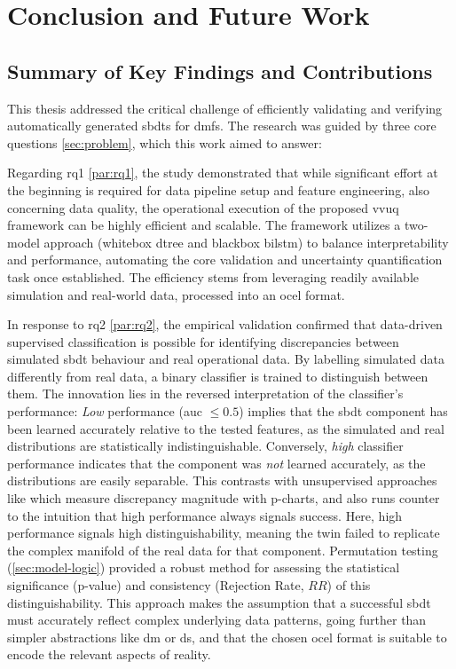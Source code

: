 \chapter{Conclusion and Future Work}
\label{chap:conclusion}

\section{Summary of Key Findings and Contributions}
\label{sec:conclusion_summary_findings}

This thesis addressed the critical challenge of efficiently validating and verifying automatically generated \gls{sbdt}s for \gls{dmfs}. The research was guided by three core questions \autoref{sec:problem}, which this work aimed to answer:

Regarding \gls{rq}1 \autoref{par:rq1}, the study demonstrated that while significant effort at the beginning is required for data pipeline setup and feature engineering, also concerning data quality, the operational execution of the proposed \gls{vvuq} framework can be highly efficient and scalable. The framework utilizes a two-model approach (whitebox \gls{dtree} and blackbox \gls{bilstm}) to balance interpretability and performance, automating the core validation and uncertainty quantification task once established. The efficiency stems from leveraging readily available simulation and real-world data, processed into an \gls{ocel} format.

In response to \gls{rq}2 \autoref{par:rq2}, the empirical validation confirmed that data-driven supervised classification is possible for identifying discrepancies between simulated \gls{sbdt} behaviour and real operational data. By labelling simulated data differently from real data, a binary classifier is trained to distinguish between them. The innovation lies in the reversed interpretation of the classifier's performance: \textit{Low} performance (\gls{auc} $\le 0.5$) implies that the \gls{sbdt} component has been learned accurately relative to the tested features, as the simulated and real distributions are statistically indistinguishable. Conversely, \textit{high} classifier performance indicates that the component was \textit{not} learned accurately, as the distributions are easily separable. This contrasts with unsupervised approaches like \textcite{dos2024digital} which measure discrepancy magnitude with p-charts, and also runs counter to the intuition that high performance always signals success. Here, high performance signals high distinguishability, meaning the twin failed to replicate the complex manifold of the real data for that component. Permutation testing (\autoref{sec:model-logic}) provided a robust method for assessing the statistical significance (p-value) and consistency (Rejection Rate, $RR$) of this distinguishability. This approach makes the assumption that a successful \gls{sbdt} must accurately reflect complex underlying data patterns, going further than simpler abstractions like \gls{dm} or \gls{ds}, and that the chosen \gls{ocel} format is suitable to encode the relevant aspects of reality.

